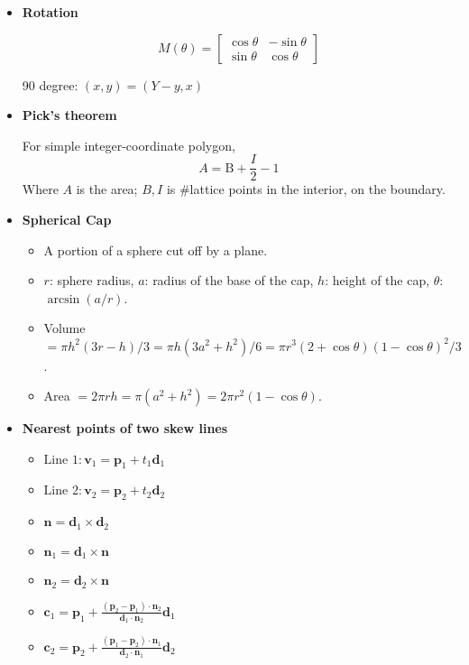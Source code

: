 \begin{itemize}

\item \textbf{Rotation}

$$
M(\theta) =
    \begin{bmatrix}
        \cos\theta & -\sin\theta\\
        \sin\theta & \cos\theta
    \end{bmatrix}
$$

90 degree: $(x, y) = (Y - y, x)$

\item \textbf{Pick's theorem}

For simple integer-coordinate polygon, 
$$A=\text{B} + \frac{I}{2} - 1$$
Where $A$ is the area; $B, I$ is \#lattice points in the interior, on the boundary.

\item \textbf{Spherical Cap}

\begin{itemize}
  \item A portion of a sphere cut off by a plane.
  \item $r$: sphere radius, $a$: radius of the base of the cap, $h$: height of the cap, $\theta$: $\arcsin(a/r)$.
  \item Volume $=\pi h^2(3r-h)/3=\pi h(3a^2+h^2)/6=\pi r^3(2+\cos\theta)(1-\cos\theta)^2/3$.
  \item Area $=2\pi rh=\pi(a^2+h^2)=2\pi r^2(1-\cos\theta)$.
\end{itemize}

\item \textbf{Nearest points of two skew lines}

\begin{itemize}
\item $\text{Line 1}: \boldsymbol{v}_1 = \boldsymbol{p}_1 + t_1\boldsymbol{d}_1$
\item $\text{Line 2}: \boldsymbol{v}_2 = \boldsymbol{p}_2 + t_2\boldsymbol{d}_2$
\item $\boldsymbol{n} = \boldsymbol{d}_1\times \boldsymbol{d}_2$
\item $\boldsymbol{n}_1 = \boldsymbol{d}_1 \times \boldsymbol{n}$
\item $\boldsymbol{n}_2 = \boldsymbol{d}_2 \times \boldsymbol{n}$
\item $\boldsymbol{c}_1 = \boldsymbol{p}_1 + \frac{(\boldsymbol{p}_2 - \boldsymbol{p}_1)\cdot\boldsymbol{n}_2}{\boldsymbol{d}_1\cdot\boldsymbol{n}_2}\boldsymbol{d}_1$
\item $\boldsymbol{c}_2 = \boldsymbol{p}_2 + \frac{(\boldsymbol{p}_1 - \boldsymbol{p}_2)\cdot\boldsymbol{n}_1}{\boldsymbol{d}_2\cdot\boldsymbol{n}_1}\boldsymbol{d}_2$
\end{itemize}
\end{itemize}
